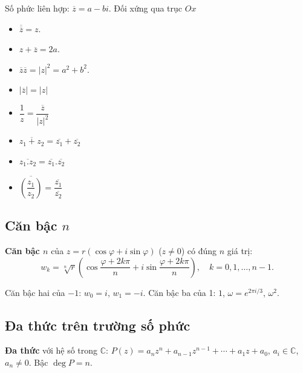 \documentclass[12pt,a4paper]{article}
\begin{document}
\begin{dinhnghia}
  Số phức liên hợp: $\overline{z} = a - bi$. Đối xứng qua trục $Ox$
\end{dinhnghia}

\begin{tinhchat}
  \begin{itemize}
      \item $\overline{\overline{z}} = z$.
      \item $z + \overline{z} = 2a$.
      \item $\overline{z}\overline{z} = |z|^2 = a^2 + b^2$.
      \item $|\overline{z}| = |z|$
      \item $\dfrac{1}{z} = \dfrac{\overline{z}}{|z|^2}$
      \item $\overline{z_1 + z_2} = \overline{z_1} + \overline{z_2}$
      \item $\overline{z_1 . z_2} = \overline{z_1} . \overline{z_2}$
      \item $\overline{(\dfrac{z_1}{z_2})} = \dfrac{\overline{z_1}}{\overline{z_2}}$
  \end{itemize}
\end{tinhchat}

\subsection{Căn bậc $n$}

\begin{dinhnghia}
  \textbf{Căn bậc $n$} của $z = r(\cos\varphi + i\sin\varphi)$ ($z \ne 0$) có đúng $n$ giá trị:
  \[
    w_k = \sqrt[n]{r}\left(\cos\frac{\varphi + 2k\pi}{n} + i\sin\frac{\varphi + 2k\pi}{n}\right), \quad k = 0, 1, \ldots, n-1.
  \]
\end{dinhnghia}

\begin{vidu}
  Căn bậc hai của $-1$: $w_0 = i$, $w_1 = -i$. Căn bậc ba của 1: $1$, $\omega = e^{2\pi i/3}$, $\omega^2$.
\end{vidu}

\subsection{Đa thức trên trường số phức}

\begin{dinhnghia}
  \textbf{Đa thức} với hệ số trong $\mathbb{C}$: $P(z) = a_n z^n + a_{n-1} z^{n-1} + \cdots + a_1 z + a_0$, $a_i \in \mathbb{C}$, $a_n \ne 0$. Bậc $\deg P = n$.
\end{dinhnghia}
\end{document}
